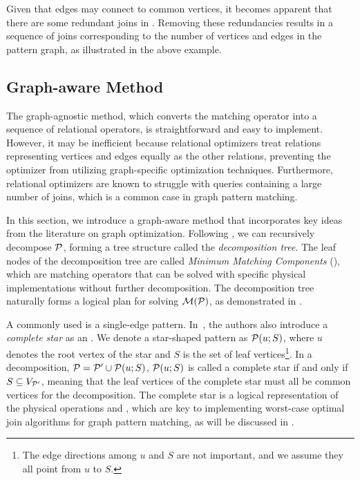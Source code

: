 Given that edges may connect to common vertices, it becomes apparent that there are some redundant joins in . Removing these redundancies results in a sequence of joins corresponding to the number of vertices and edges in the pattern graph, as illustrated in the above example.

\subsection{Graph-aware Method}
\label{sec:graph-aware}
The graph-agnostic method, which converts the matching operator into a sequence of relational operators, is straightforward and easy to implement. However, it may be inefficient because relational optimizers treat relations representing vertices and edges equally as the other relations, preventing the optimizer from utilizing graph-specific optimization techniques. Furthermore, relational optimizers are known to struggle with queries containing a large number of joins, which is a common case in graph pattern matching.

In this section, we introduce a graph-aware method that incorporates key ideas from the literature on graph optimization. Following , we can recursively decompose $\mathcal{P}$, forming a tree structure called the \emph{decomposition tree}. The leaf nodes of the decomposition tree are called \emph{Minimum Matching Components} (\mmc), which are matching operators that can be solved with specific physical implementations without further decomposition. The decomposition tree naturally forms a logical plan for solving $\mathcal{M}(\mathcal{P})$, as demonstrated in .

A commonly used \mmc is a single-edge pattern. In~\cite{huge}, the authors also introduce a \emph{complete star} as an \mmc. We denote a star-shaped pattern as $\mathcal{P}(u;S)$, where $u$ denotes the root vertex of the star and $S$ is the set of leaf vertices\footnote{The edge directions among $u$ and $S$ are not important, and we assume they  all point from $u$ to $S$.}.
In a decomposition, $\mathcal{P} = \mathcal{P}' \cup \mathcal{P}(u;S)$, $\mathcal{P}(u;S)$ is called a complete star if and only if $S \subseteq V_{\mathcal{P}'}$,
meaning that the leaf vertices of the complete star must all be common vertices for the decomposition. The complete star is a logical representation of the physical operations \expand and \intersection, which are key to implementing worst-case optimal join algorithms for graph pattern matching, as will be discussed in .

